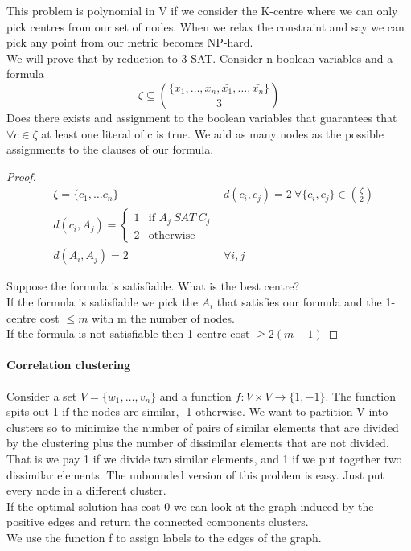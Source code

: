 \documentclass[]{article}
\begin{document}
This problem is polynomial in V if we consider the K-centre where we can only pick centres from our set of nodes. When we relax the constraint and say we can pick any point from our metric becomes NP-hard.\\
We will prove that by reduction to 3-SAT. Consider n boolean variables and a formula
\[ \zeta \subseteq {\{x_1, \dots , x_n, \bar{x_1}, \dots, \bar{x_n} \} \choose 3}\]
Does there exists and assignment to the boolean variables that guarantees that $ \forall c \in \zeta $ at least one literal of c is true. We add as many nodes as the possible assignments to the clauses of our formula.

\begin{proof}
	\begin{align*}
	&\zeta = \{c_1, \dots c_n\}&d(c_i, c_j) = 2\ \forall \{c_i,c_j\} \in {\zeta\choose 2}\\
	&d(c_i, A_j) = \begin{cases}
	1&\text{if }A_j\ SAT\ C_j\\
	2&\text{otherwise} 
	\end{cases}\\
	&d(A_i, A_j) = 2 &\forall i, j
	\end{align*}
	
	Suppose the formula is satisfiable. What is the best centre? \\
	If the formula is satisfiable we pick the $ A_i $ that satisfies our formula and the 1-centre cost $ \leq m $ with m the number of nodes.\\
	If the formula is not satisfiable then 1-centre cost $ \geq 2(m-1)$
\end{proof}

\paragraph{Correlation clustering}
Consider a set $ V = \{w_1, \dots, v_n\} $ and a function $ f:V\times V \rightarrow \{1, -1\} $. The function spits out 1 if the nodes are similar, -1 otherwise. We want to partition V into clusters so to minimize the number of pairs of similar elements that are divided by the clustering plus the number of dissimilar elements that are not divided. That is we pay 1 if we divide two similar elements, and 1 if we put together two dissimilar elements. The unbounded version of this problem is easy. Just put every node in a different cluster.\\
If the optimal solution has cost 0 we can look at the graph induced by the positive edges and return the connected components clusters.\\
We use the function f to assign labels to the edges of the graph.
\end{document}

